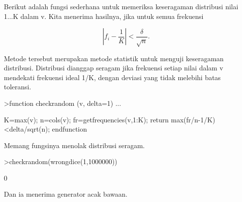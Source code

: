 \documentclass{article}
\begin{document}
\begin{eulernotebook}
\begin{eulercomment}
\begin{eulercomment}
\begin{eulercomment}
Berikut adalah fungsi sederhana untuk memeriksa keseragaman distribusi
nilai 1...K dalam v. Kita menerima hasilnya, jika untuk semua
frekuensi

\end{eulercomment}
\begin{eulerformula}
\[
\left|f_i-\frac{1}{K}\right| < \frac{\delta}{\sqrt{n}}.
\]
\end{eulerformula}
\begin{eulercomment}
Metode tersebut merupakan metode statistik untuk menguji keseragaman
distribusi. Distribusi dianggap seragam jika frekuensi setiap nilai
dalam v mendekati frekuensi ideal 1/K, dengan deviasi yang tidak
melebihi batas toleransi.
\end{eulercomment}
\begin{eulerprompt}
>function checkrandom (v, delta=1) ...
\end{eulerprompt}
\begin{eulerudf}
    K=max(v); n=cols(v);
    fr=getfrequencies(v,1:K);
    return max(fr/n-1/K)<delta/sqrt(n);
    endfunction
\end{eulerudf}
\begin{eulercomment}
Memang fungsinya menolak distribusi seragam.
\end{eulercomment}
\begin{eulerprompt}
>checkrandom(wrongdice(1,1000000))
\end{eulerprompt}
\begin{euleroutput}
  0
\end{euleroutput}
\begin{eulercomment}
Dan ia menerima generator acak bawaan.


\end{eulercomment}
\end{eulercomment}
\end{eulercomment}
\end{eulernotebook}
\end{document}

